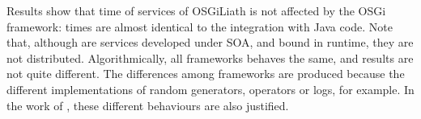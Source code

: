 \begin{table}
\caption{Comparison of tested EA frameworks in time and development.}
\label{tab:times}
\end{table}

Results show that time of services of OSGiLiath is not affected by the
OSGi framework: times are almost identical to the integration with
Java code. Note that, although are services developed under SOA, and
bound in runtime, they are not distributed. Algorithmically, all
frameworks behaves the same, and results are not quite different. The
differences among frameworks are produced because the different
implementations of random generators, operators or logs, for
example. In the work of  \cite{PERL}, these
different behaviours are also justified. %



